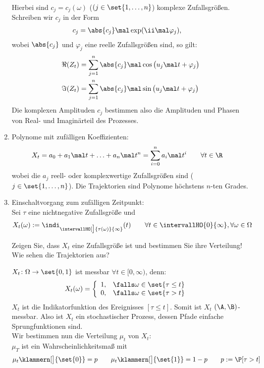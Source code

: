 \begin{beispiel}
\begin{enumerate}[label=(\alph*)]
\begin{align*}
		\end{align*}
		Hierbei sind $c_j=c_j(\omega)$ ($(j\in\set{1,\ldots,n}$) komplexe Zufallsgrößen.
		Schreiben wir $c_j$ in der Form
		\begin{align*}
			c_j&=\abs{c_j}\mal\exp(\ii\mal\varphi_j),
		\end{align*}
		wobei $\abs{c_j}$ und $\varphi_j$ eine reelle Zufallsgrößen sind, so gilt:
		\begin{align*}
			\Re(Z_t)&=\sum\limits_{j=1}^n\abs{c_j}\mal\cos\big(u_j\mal t+\varphi_j\big)\\
			\Im(Z_t)&=\sum\limits_{j=1}^n\abs{c_j}\mal\sin\big(u_j\mal t+\varphi_j\big)
		\end{align*}
		Die komplexen Amplituden $c_j$ bestimmen also die Amplituden und Phasen von Real- und Imaginärteil des Prozesses.
		\item Polynome mit zufälligen Koeffizienten:\label{beisp:1.3.3(c)}
		\begin{align*}
			X_t&=a_0+a_1\mal t+\ldots+a_n\mal t^n=\sum\limits_{i=0}^n a_i\mal t^i
			\qquad\forall t\in\R
		\end{align*}
		wobei die $a_j$ reell- oder komplexwertige Zufallsgrößen sind ($j\in\set{1,\ldots,n}$).
		Die Trajektorien sind Polynome höchstens $n$-ten Grades.
		\item Einschaltvorgang zum zufälligen Zeitpunkt:\label{beisp:1.3.3(d)}\\
		Sei $\tau$ eine nichtnegative Zufallsgröße und 
		\begin{align*}
			X_t(\omega):=\indi_{\intervallHO[\big]{\tau(\omega)}{\infty}}(t)\qquad\forall t\in\intervallHO{0}{\infty},\forall\omega\in\Omega
		\end{align*}
		\begin{aufgabe}\enter
			Zeigen Sie, dass $X_t$ eine Zufallsgröße ist und bestimmen Sie ihre Verteilung!
			Wie sehen die Trajektorien aus?
		\end{aufgabe}
		\begin{lösung}
			$X_t\colon\Omega\to\set{0,1}$ ist messbar $\forall t\in[0,\infty)$, denn:
			\begin{align*}
				X_t(\omega)&=\left\lbrace\begin{array}{cl}
					1, &\falls \omega\in\set{\tau\leq t}\\
					0, &\falls \omega\in\set{\tau>t}
				\end{array}\right.
			\end{align*}
			$X_t$ ist die Indikatorfunktion des Ereignisses $[\tau\leq t]$.
			Somit ist $X_t$ $(\A,\B)$-messbar.
			Also ist $X_t$ ein stochastischer Prozess, dessen Pfade einfache Sprungfunktionen sind.\\
			Wir bestimmen nun die Verteilung $\mu_t$ von $X_t$:\\
			$\mu_T$ ist ein Wahrscheinlichkeitsmaß mit
			\begin{align*}
				\mu_t\klammern[\big]{\set{0}}=p\qquad
				\mu_t\klammern[\big]{\set{1}}=1-p\qquad
				p:=\P[\tau>t]
			\end{align*}
		\end{lösung}
	\end{enumerate}
\end{beispiel}
